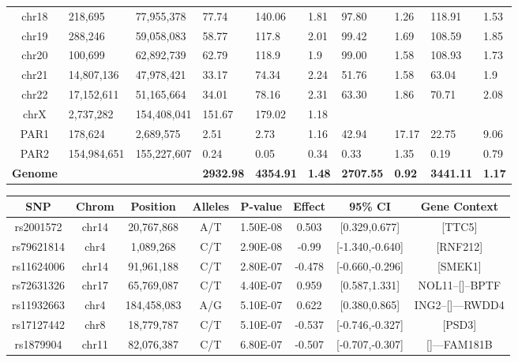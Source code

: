 \begin{table}[!h]
\begin{tabular}{|cp{1.0cm}p{1.4cm}p{1.1cm}p{1.1cm}p{1.0cm}p{1.1cm}p{1.0cm}p{1.1cm}p{1.0cm}|}
chr18 & 218,695 & 77,955,378 & 77.74 & 140.06 & 1.81 & 97.80 & 1.26 & 118.91 & 1.53 \\
chr19 & 288,246 & 59,058,083 & 58.77 & 117.8 & 2.01 & 99.42 & 1.69 & 108.59 & 1.85 \\
chr20 & 100,699 & 62,892,739 & 62.79 & 118.9 & 1.9 & 99.00 & 1.58 & 108.93 & 1.73 \\
chr21 & 14,807,136 & 47,978,421 & 33.17 & 74.34 & 2.24 & 51.76 & 1.58 & 63.04 & 1.9 \\
chr22 & 17,152,611 & 51,165,664 & 34.01 & 78.16 & 2.31 & 63.30 & 1.86 & 70.71 & 2.08 \\
chrX & 2,737,282 & 154,408,041 & 151.67 & 179.02 & 1.18 &  &  &  &  \\
PAR1 & 178,624 & 2,689,575 & 2.51 & 2.73 & 1.16 & 42.94 & 17.17 & 22.75 & 9.06 \\
PAR2 & 154,984,651 & 155,227,607 & 0.24 & 0.05 & 0.34 & 0.33 & 1.35 & 0.19 & 0.79 \\
        \hline \textbf{Genome} &&& \textbf{2932.98} & \textbf{4354.91} & \textbf{1.48} & \textbf{2707.55} & \textbf{0.92} & \textbf{3441.11} & \textbf{1.17} \\
    \hline \end{tabular}
\end{table}

\begin{table}[!h] \centering
    \footnotesize
    \begin{tabular}{|cccccccc|}
        \hline 
SNP & Chrom & Position & Alleles & P-value & Effect & 95\% CI & Gene Context \\ \hline
rs2001572 & chr14 & 20,767,868 & A/T & 1.50E-08 & 0.503 & [0.329,0.677] & [TTC5] \\
rs79621814 & chr4 & 1,089,268 & C/T & 2.90E-08 & -0.99 & [-1.340,-0.640] & [RNF212] \\
rs11624006 & chr14 & 91,961,188 & C/T & 2.80E-07 & -0.478 & [-0.660,-0.296] & [SMEK1] \\
rs72631326 & chr17 & 65,769,087 & C/T & 4.40E-07 & 0.959 & [0.587,1.331] & NOL11--[]--BPTF \\
rs11932663 & chr4 & 184,458,083 & A/G & 5.10E-07 & 0.622 & [0.380,0.865] & ING2--[]---RWDD4 \\
rs17127442 & chr8 & 18,779,787 & C/T & 5.10E-07 & -0.537 & [-0.746,-0.327] & [PSD3] \\
rs1879904 & chr11 & 82,076,387 & C/T & 6.80E-07 & -0.507 & [-0.707,-0.307] & []---FAM181B \\
    \hline \end{tabular}
\end{table}

